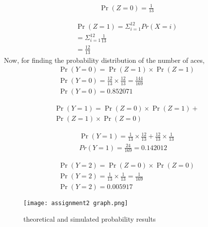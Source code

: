 \documentclass[journal,12pt,twocolumn]{IEEEtran}
\begin{document}
\begin{align}
    \Pr(Z=0) = \frac{1}{13}
\end{align}

\begin{align}
    \Pr(Z=1) = \Sigma_{i=1}^{12} Pr(X=i)
    \\ = \Sigma_{i=1}^{12}\frac{1}{13}
    \\ = \frac{12}{13}
\end{align}
Now, for finding the probability distribution of the number of aces, 
\begin{align}
    \Pr(Y=0) = \Pr(Z=1) \times \Pr(Z=1)
    \\\Pr(Y=0) = \frac{12}{13} \times \frac{12}{13} = \frac{144}{169}
    \\\Pr(Y=0) = 0.852071
\end{align}
 


\begin{multline}
    \Pr(Y=1) = \Pr(Z=0) \times \Pr(Z=1) + 
    \\\Pr(Z=1) \times \Pr(Z=0)
\end{multline} 

\begin{align}
    \Pr(Y=1) = \frac{1}{13} \times \frac{12}{13} + \frac{12}{13} \times \frac{1}{13}
    \\Pr(Y=1) = \frac{24}{169} = 0.142012
\end{align}    
   


\begin{align}
    \Pr(Y=2) = \Pr(Z=0) \times \Pr(Z=0)
    \\\Pr(Y=2) = \frac{1}{13} \times \frac{1}{13} = \frac{1}{169}
    \\\Pr(Y=2) = 0.005917
\end{align}
\begin{center}
\begin{table}[h]
    \centering
    \caption{Probability distribution table }
    \label{table 1}
\end{table}
\end{center}



\begin{figure} [H]
    \texttt{[image: assignment2 graph.png]}
    \caption{theoretical and simulated probability results}
\end{figure}
\end{document}
